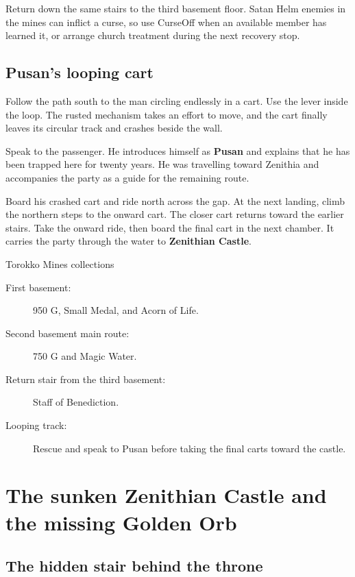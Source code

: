 Return down the same stairs to the third basement floor.
Satan Helm enemies in the mines can inflict a curse, so use
CurseOff when an available member has learned it, or arrange
church treatment during the next recovery stop.

\subsection*{Pusan's looping cart}

Follow the path south to the man circling endlessly in a cart.
Use the lever inside the loop. The rusted mechanism takes an
effort to move, and the cart finally leaves its circular track
and crashes beside the wall.

Speak to the passenger. He introduces himself as \textbf{Pusan}
and explains that he has been trapped here for twenty years.
He was travelling toward Zenithia and accompanies the party
as a guide for the remaining route.

Board his crashed cart and ride north across the gap. At the
next landing, climb the northern steps to the onward cart.
The closer cart returns toward the earlier stairs. Take the
onward ride, then board the final cart in the next chamber.
It carries the party through the water to \textbf{Zenithian Castle}.

\begin{routecheck}{Torokko Mines collections}
\begin{description}
  \item[First basement:] 950 G, Small Medal, and Acorn of Life.
  \item[Second basement main route:] 750 G and Magic Water.
  \item[Return stair from the third basement:] Staff of Benediction.
  \item[Looping track:] Rescue and speak to Pusan before taking
    the final carts toward the castle.
\end{description}
\end{routecheck}

\section{The sunken Zenithian Castle and the missing Golden Orb}

\subsection*{The hidden stair behind the throne}

